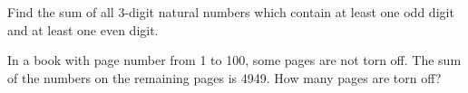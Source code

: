 \item Find the sum of all 3-digit natural numbers which contain at least one odd digit and at least one even digit.

\item In a book with page number from 1 to 100, some pages are not torn off. The sum of the numbers on the remaining pages is 4949. How many pages are torn off?
